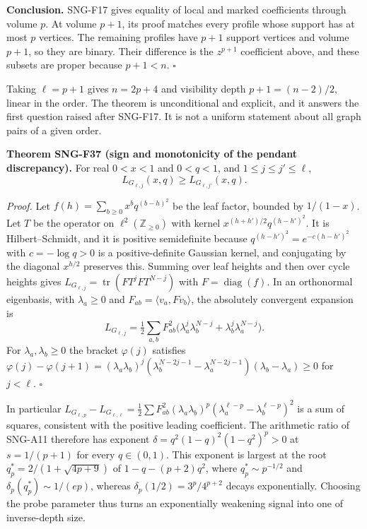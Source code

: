 \documentclass[
  11pt,
  a4paper,
]{report}
\begin{document}
\textbf{Conclusion.} SNG-F17 gives equality of local and marked
coefficients through volume \(p\). At volume \(p+1\), its proof matches
every profile whose support has at most \(p\) vertices. The remaining
profiles have \(p+1\) support vertices and volume \(p+1\), so they are
binary. Their difference is the \(z^{p+1}\) coefficient above, and these
subsets are proper because \(p+1<n\). \(\square\)

Taking \(\ell=p+1\) gives \(n=2p+4\) and visibility depth
\(p+1=(n-2)/2\), linear in the order. The theorem is unconditional and
explicit, and it answers the first question raised after SNG-F17. It is
not a uniform statement about all graph pairs of a given order.

\textbf{Theorem SNG-F37 (sign and monotonicity of the pendant
discrepancy).} For real \(0<x<1\) and \(0<q<1\), and
\(1\le j\le j'\le\ell\), \[
L_{G_{\ell,j}}(x,q)\ge L_{G_{\ell,j'}}(x,q).
\]

\emph{Proof.} Let \(f(h)=\sum_{b\ge0}x^bq^{(b-h)^2}\) be the leaf
factor, bounded by \(1/(1-x)\). Let \(T\) be the operator on
\(\ell^2(\mathbb Z_{\ge0})\) with kernel \(x^{(h+h')/2}q^{(h-h')^2}\).
It is Hilbert--Schmidt, and it is positive semidefinite because
\(q^{(h-h')^2}=e^{-c(h-h')^2}\) with \(c=-\log q>0\) is a
positive-definite Gaussian kernel, and conjugating by the diagonal
\(x^{h/2}\) preserves this. Summing over leaf heights and then over
cycle heights gives \(L_{G_{\ell,j}}=\operatorname{tr}(FT^jFT^{N-j})\)
with \(F=\operatorname{diag}(f)\). In an orthonormal eigenbasis, with
\(\lambda_a\ge0\) and \(F_{ab}=\langle v_a,Fv_b\rangle\), the absolutely
convergent expansion is \[
L_{G_{\ell,j}}=\tfrac12\sum_{a,b}F_{ab}^2\bigl(\lambda_a^j\lambda_b^{N-j}+\lambda_b^j\lambda_a^{N-j}\bigr).
\] For \(\lambda_a,\lambda_b\ge0\) the bracket \(\varphi(j)\) satisfies
\(\varphi(j)-\varphi(j+1)=(\lambda_a\lambda_b)^j(\lambda_b^{N-2j-1}-\lambda_a^{N-2j-1})(\lambda_b-\lambda_a)\ge0\)
for \(j<\ell\). \(\square\)

In particular
\(L_{G_{\ell,p}}-L_{G_{\ell,\ell}}=\frac12\sum F_{ab}^2(\lambda_a\lambda_b)^p(\lambda_a^{\ell-p}-\lambda_b^{\ell-p})^2\)
is a sum of squares, consistent with the positive leading coefficient.
The arithmetic ratio of SNG-A11 therefore has exponent
\(\delta=q^2(1-q)^2(1-q^2)^p>0\) at \(s=1/(p+1)\) for every
\(q\in(0,1)\). This exponent is largest at the root
\(q_p^*=2/(1+\sqrt{4p+9})\) of \(1-q-(p+2)q^2\), where
\(q_p^*\sim p^{-1/2}\) and \(\delta_p(q_p^*)\sim1/(ep)\), whereas
\(\delta_p(1/2)=3^p/4^{p+2}\) decays exponentially. Choosing the probe
parameter thus turns an exponentially weakening signal into one of
inverse-depth size.
\end{document}
